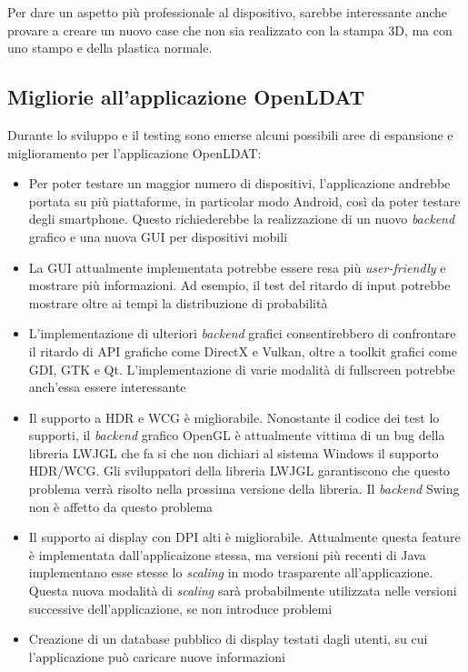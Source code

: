 Per dare un aspetto più professionale al dispositivo, sarebbe interessante anche provare a creare un nuovo case che non sia realizzato con la stampa 3D, ma con uno stampo e della plastica normale.

\subsection{Migliorie all'applicazione OpenLDAT}
Durante lo sviluppo e il testing sono emerse alcuni possibili aree di espansione e miglioramento per l'applicazione OpenLDAT:\begin{itemize}
	\item Per poter testare un maggior numero di dispositivi, l'applicazione andrebbe portata su più piattaforme, in particolar modo Android, così da poter testare degli smartphone. Questo richiederebbe la realizzazione di un nuovo \textit{backend} grafico e una nuova GUI per dispositivi mobili
	\item La GUI attualmente implementata potrebbe essere resa più \textit{user-friendly} e mostrare più informazioni. Ad esempio, il test del ritardo di input potrebbe mostrare oltre ai tempi la distribuzione di probabilità
	\item L'implementazione di ulteriori \textit{backend} grafici consentirebbero di confrontare il ritardo di API grafiche come DirectX e Vulkan, oltre a toolkit grafici come GDI, GTK e Qt. L'implementazione di varie modalità di fullscreen potrebbe anch'essa essere interessante
	\item Il supporto a HDR e WCG è migliorabile. Nonostante il codice dei test lo supporti, il \textit{backend} grafico OpenGL è attualmente vittima di un bug della libreria LWJGL che fa si che non dichiari al sistema Windows il supporto HDR/WCG. Gli sviluppatori della libreria LWJGL garantiscono che questo problema verrà risolto nella prossima versione della libreria. Il \textit{backend} Swing non è affetto da questo problema
	\item Il supporto ai display con DPI alti è migliorabile. Attualmente questa feature è implementata dall'applicaizone stessa, ma versioni più recenti di Java implementano esse stesse lo \textit{scaling} in modo trasparente all'applicazione. Questa nuova modalità di \textit{scaling} sarà probabilmente utilizzata nelle versioni successive dell'applicazione, se non introduce problemi
	\item Creazione di un database pubblico di display testati dagli utenti, su cui l'applicazione può caricare nuove informazioni
\end{itemize}

